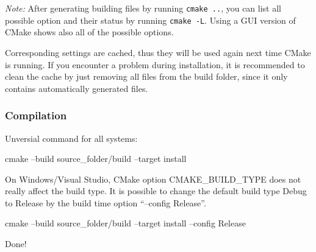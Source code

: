 \textit{Note:} After generating building files by running \texttt{cmake ..}, you can list all possible option and their status by running \texttt{cmake -L}. 
Using a GUI version of CMake shows also all of the possible options.   

Corresponding settings are cached, thus they will be used again next time CMake is running.
If you encounter a problem during installation, it is recommended to clean the cache by just removing all files from the build folder, since it only contains automatically generated files. 


\subsubsection{Compilation}
Unversial command for all systems:
\begin{listing}[mybash]
cmake --build {source_folder}/build --target install
\end{listing}

On Windows/Visual Studio, CMake option CMAKE\_BUILD\_TYPE does not really affect the build type. It is possible to change the default build type Debug to Release by the build time option ``--config Release''.
\begin{listing}[mybash]
cmake --build {source_folder}/build --target install --config Release
\end{listing}

Done!
